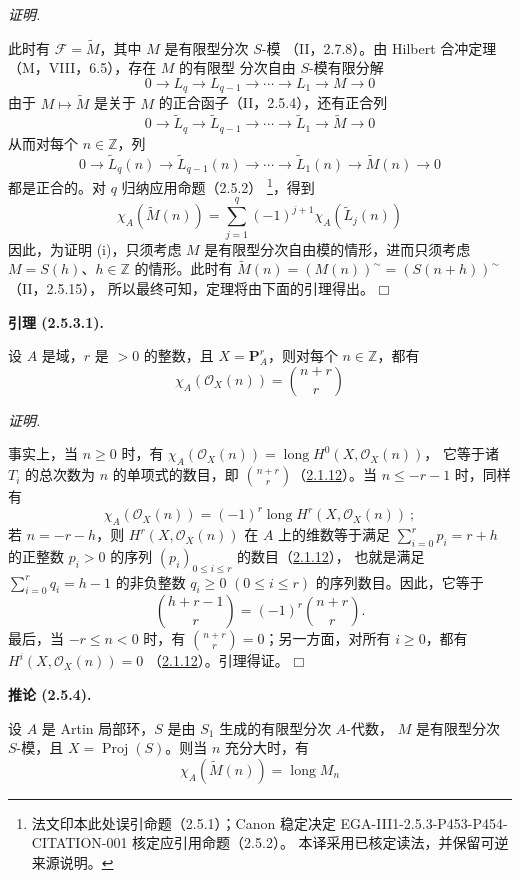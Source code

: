 \documentclass[UTF8,fontset=none,11pt,oneside,openany]{ctexbook}
\providecommand{\square}{\mdlgwhtsquare}
\newcommand{\SourceCorrectionNote}[1]{\footnote{#1}}
\newenvironment{lemma}[1][]{%
  \par\medskip\noindent\textbf{引理 (#1).}\ %
}{\par}
\newenvironment{corollary}[1][]{%
  \par\medskip\noindent\textbf{推论 (#1).}\ %
}{\par}
\newenvironment{proof}{%
  \par\smallskip\noindent\textit{证明.}\ %
}{\hfill$\square$\par}
\newcommand{\oldpage}[2][]{%
  \hypertarget{ega-source-page-#1-#2}{}%
  \marginnote{\scriptsize\textbf{#1}~|~#2}\ignorespaces}
\let\EGAOriginalLabel\label
\renewcommand{\label}[1]{\phantomsection\EGAOriginalLabel{#1}}
\begin{document}
\begin{proof}
此时有 $\mathcal F=\widetilde M$，其中 $M$ 是有限型分次 $S$-模
（II，2.7.8）。由 Hilbert 合冲定理（M，VIII，6.5），存在 $M$ 的有限型
分次自由 $S$-模有限分解
\[
0\to L_q\to L_{q-1}\to\cdots\to L_1\to M\to0
\]
由于 $M\mapsto\widetilde M$ 是关于 $M$ 的正合函子（II，2.5.4），还有正合列
\[
0\to\widetilde L_q\to\widetilde L_{q-1}\to\cdots
\to\widetilde L_1\to\widetilde M\to0
\]
从而对每个 $n\in\mathbb Z$，列
\[
0\to\widetilde L_q(n)\to\widetilde L_{q-1}(n)\to\cdots
\to\widetilde L_1(n)\to\widetilde M(n)\to0
\]
都是正合的。对 $q$ 归纳应用命题（2.5.2）
\SourceCorrectionNote{法文印本此处误引命题（2.5.1）；Canon 稳定决定
EGA-III1-2.5.3-P453-P454-CITATION-001 核定应引用命题（2.5.2）。
本译采用已核定读法，并保留可逆来源说明。}，得到
\[
\chi_A(\widetilde M(n))=\sum_{j=1}^{q}(-1)^{j+1}
\chi_A(\widetilde L_j(n))
\]
因此，为证明 (i)，只须考虑 $M$ 是有限型分次自由模的情形，进而只须考虑
$M=S(h)$、$h\in\mathbb Z$ 的情形。此时有
$\widetilde M(n)=(M(n))^\sim=(S(n+h))^\sim$（II，2.5.15），
所以最终可知，定理将由下面的引理得出。
\end{proof}

\oldpage[III]{111}
\begin{lemma}[2.5.3.1]
\label{III.2.5.3.1-fr}
设 $A$ 是域，$r$ 是 $>0$ 的整数，且 $X=\mathbf P_A^r$，则对每个
$n\in\mathbb Z$，都有
\[
\chi_A(\mathcal O_X(n))=\binom{n+r}{r}
\]
\end{lemma}

\begin{proof}
事实上，当 $n\geq0$ 时，有
$\chi_A(\mathcal O_X(n))=\operatorname{long}H^0(X,\mathcal O_X(n))$，
它等于诸 $T_i$ 的总次数为 $n$ 的单项式的数目，即
$\binom{n+r}{r}$（\hyperref[III.2.1.12-fr]{2.1.12}）。当
$n\leq-r-1$ 时，同样有
\[
\chi_A(\mathcal O_X(n))=(-1)^r
\operatorname{long}H^r(X,\mathcal O_X(n))~;
\]
若 $n=-r-h$，则 $H^r(X,\mathcal O_X(n))$ 在 $A$ 上的维数等于满足
$\sum_{i=0}^{r}p_i=r+h$ 的正整数 $p_i>0$ 的序列
$(p_i)_{0\leq i\leq r}$ 的数目（\hyperref[III.2.1.12-fr]{2.1.12}），
也就是满足 $\sum_{i=0}^{r}q_i=h-1$ 的非负整数 $q_i\geq0$
$(0\leq i\leq r)$ 的序列数目。因此，它等于
\[
\binom{h+r-1}{r}=(-1)^r\binom{n+r}{r}.
\]
最后，当 $-r\leq n<0$ 时，有 $\binom{n+r}{r}=0$；另一方面，对所有
$i\geq0$，都有 $H^i(X,\mathcal O_X(n))=0$
（\hyperref[III.2.1.12-fr]{2.1.12}）。引理得证。
\end{proof}

\begin{corollary}[2.5.4]
\label{III.2.5.4-fr}
设 $A$ 是 Artin 局部环，$S$ 是由 $S_1$ 生成的有限型分次 $A$-代数，
$M$ 是有限型分次 $S$-模，且 $X=\operatorname{Proj}(S)$。则当 $n$
充分大时，有
\[
\chi_A(\widetilde M(n))=\operatorname{long}M_n
\]
\end{corollary}
\end{document}

